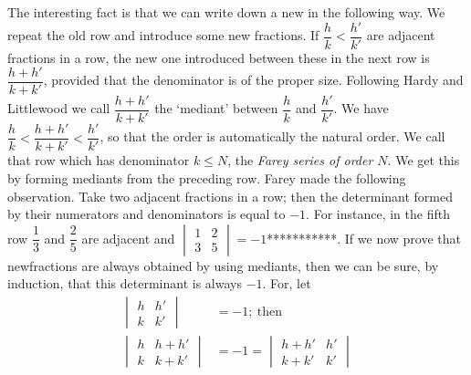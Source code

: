 The interesting fact is that we can write down a new in the following
way. We repeat the old row and introduce some new fractions. If
$\dfrac{h}{k} < \dfrac{h'}{k'}$ are adjacent fractions in a row, the
new one introduced between these in the next row is
$\dfrac{h+h'}{k+k'}$, provided that the denominator is of the proper
size. Following Hardy and Littlewood we call $\dfrac{h+h'}{k+k'}$ the
`mediant' between $\dfrac{h}{k}$ and $\dfrac{h'}{k'}$. We have
$\dfrac{h}{k} < \dfrac{h+h'}{k+k'} < \dfrac{h'}{k'}$, so that the
order is automatically the natural order. We call that row which has
denominator $k \leq N$, the \textit{Farey series of order $N$}. We get
this by forming mediants from the preceding row. Farey made the
following observation. Take two adjacent fractions in a row; then the
determinant formed by their numerators and denominators is equal to
$-1$. For instance, in the fifth row $\dfrac{1}{3}$ and $\dfrac{2}{5}$
are adjacent and $\begin{vmatrix} 1 & 2\\ 3 &
5 \end{vmatrix}=-1$***********. If we now prove that
new\pageoriginale fractions are always obtained by using mediants,
then we can be sure, by induction, that this determinant is always
$-1$. For, let
\begin{align*}
  \begin{vmatrix}
    h & h'\\
    k & k'
  \end{vmatrix} & = - 1; ~\text{then}~\\
  \begin{vmatrix}
    h & h+h'\\
    k & k+k'
  \end{vmatrix} & =- 1=  
  \begin{vmatrix} h+h' & h'\\ k+k' & k'  \end{vmatrix} 
\end{align*}

